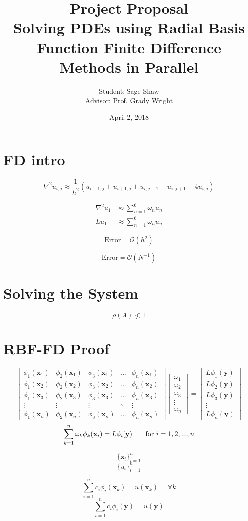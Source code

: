 \documentclass[12pt]{article}
\title{Project Proposal\\ \large Solving PDEs using Radial Basis Function Finite Difference Methods in Parallel}
\author{Student: Sage Shaw\\ Advisor: Prof. Grady Wright}
\date{April 2, 2018}
\let\vec\mathbf
\begin{document}
	\thispagestyle{empty}
	
	
\section{FD intro}

$$
\nabla^2u_{i,j} \approx \frac{1}{h^2}\left( u_{i-1,j} + u_{i+1, j} + u_{i, j-1} +u_{i, j+1} - 4u_{i,j} \right)
$$

\begin{align*}
	\nabla^2u_{1} & \approx \sum_{n=1}^6 \omega_n u_n \\
	Lu_{1} & \approx \sum_{n=1}^6 \omega_n u_n
\end{align*}

$$
\text{Error} = \mathcal{O}(h^2)
$$

$$
\text{Error} = \mathcal{O}(N^{-1})
$$

	
\section{Solving the System}

$$
\rho(A) \nless 1
$$	

\section{RBF-FD Proof}
$$
\begin{bmatrix}
	\phi_1(\vec{x}_1) & \phi_2(\vec{x}_1) & \phi_3(\vec{x}_1) & \dots & \phi_n(\vec{x}_1) \\
	\phi_1(\vec{x}_2) & \phi_2(\vec{x}_2) & \phi_3(\vec{x}_2) & \dots & \phi_n(\vec{x}_2) \\
	\phi_1(\vec{x}_3) & \phi_2(\vec{x}_3) & \phi_3(\vec{x}_3) & \dots & \phi_n(\vec{x}_3) \\
	\vdots 		& \vdots 	  & \vdots 		& \ddots& \vdots \\
	\phi_1(\vec{x}_n) & \phi_2(\vec{x}_n) & \phi_3(\vec{x}_n) & \dots & \phi_n(\vec{x}_n)
\end{bmatrix}
\begin{bmatrix}
	\omega_1 \\ \omega_2 \\ \omega_3 \\ \vdots \\ \omega_n
\end{bmatrix}
=
\begin{bmatrix}
	L\phi_1(\vec{y}) \\ L\phi_2(\vec{y}) \\ L\phi_3(\vec{y}) \\ \vdots \\ L\phi_n(\vec{y})
\end{bmatrix}
$$
$$
\sum_{k=1}^n \omega_k\phi_k(\vec{x}_i) = L\phi_i(\vec{y}) \text{\phantom{==} for } i=1,2,...,n
$$

$$
\{\vec{x}_i\}_{i=1}^n
$$
$$
\{u_i\}_{i=1}^n
$$

$$
\sum_{i=1}^n c_i \phi_i(\vec{x}_k) = u(\vec{x}_k) \phantom{=} \forall k
$$
$$
\sum_{i=1}^n c_i \phi_i(\vec{y}) = u(\vec{y})
$$
\end{document}
